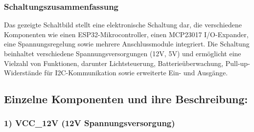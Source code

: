 \documentclass[ngerman,12pt,a4paper]{article}
\begin{document}
			\subsubsection*{Schaltungszusammenfassung}
		
		Das gezeigte Schaltbild stellt eine elektronische Schaltung dar, die verschiedene Komponenten wie einen ESP32-Mikrocontroller, einen MCP23017 I/O-Expander, eine Spannungsregelung sowie mehrere Anschlussmodule integriert. Die Schaltung beinhaltet verschiedene Spannungsversorgungen (12V, 5V) und ermöglicht eine Vielzahl von Funktionen, darunter Lichtsteuerung, Batterieüberwachung, Pull-up-Widerstände für I2C-Kommunikation sowie erweiterte Ein- und Ausgänge.
		
			\subsection*{Einzelne Komponenten und ihre Beschreibung:}
			
			\subsubsection*{1) VCC\_12V (12V Spannungsversorgung)}
			
\end{document}
